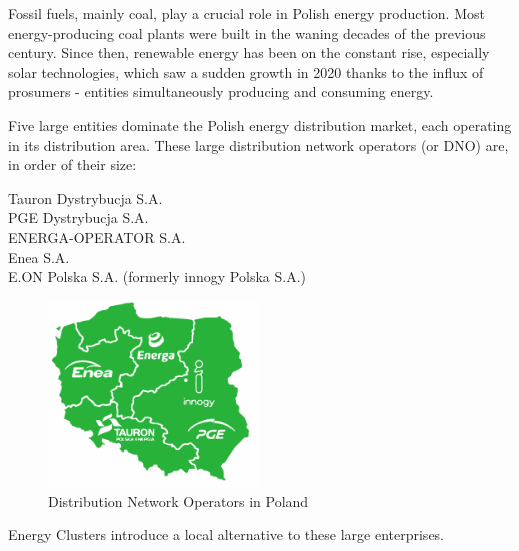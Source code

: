 \par Fossil fuels, mainly coal, play a crucial role in Polish energy production. Most energy-producing coal plants were built in the waning decades of the previous century. Since then, renewable energy has been on the constant rise, especially solar technologies, which saw a sudden growth in 2020 thanks to the influx of prosumers - entities simultaneously producing and consuming energy.
\par Five large entities dominate the Polish energy distribution market, each operating in its distribution area. These large distribution network operators (or DNO) are, in order of their size:
\begin{description}
  \item[Tauron Dystrybucja S.A.]
  \item[PGE Dystrybucja S.A.]
  \item[ENERGA-OPERATOR S.A.]
  \item[Enea S.A.]
  \item[E.ON Polska S.A. (formerly innogy Polska S.A.)]
\end{description}
\begin{figure}[htbp]
 \centering
 \includegraphics[width=0.5\textwidth]{gfx/EnergyDistributionMap}
 \caption{Distribution Network Operators in Poland}
 \label{fig:chapter02:energydistribution}
\end{figure}
\par Energy Clusters introduce a local alternative to these large enterprises. 
